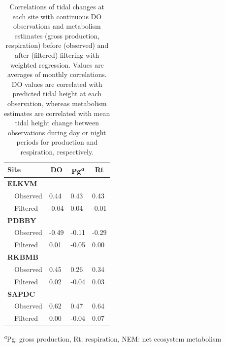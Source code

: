 \documentclass[letterpaper,12pt,oneside]{article}\usepackage[]{graphicx}\usepackage[]{color}
\begin{document}
\begin{table}[!tbp]
\caption{Correlations of tidal changes at each site with continuous \ac{DO} observations and metabolism estimates (gross production, respiration) before (observed) and after (filtered) filtering with weighted regression.  Values are averages of monthly correlations.  \ac{DO} values are correlated with predicted tidal height at each observation, whereas metabolism estimates are correlated with mean tidal height change between observations during day or night periods for production and respiration, respectively.\label{tab:cor_res}} 
\begin{center}
\begin{tabular}{llll}
\hline\hline
\multicolumn{1}{l}{Site}&\multicolumn{1}{c}{DO}&\multicolumn{1}{c}{Pg\textsuperscript{\textit{a}}}&\multicolumn{1}{c}{Rt}\tabularnewline
\hline
{\bfseries ELKVM}&&&\tabularnewline
~~Observed& 0.44& 0.43& 0.43\tabularnewline
~~Filtered&-0.04& 0.04&-0.01\tabularnewline
\hline
{\bfseries PDBBY}&&&\tabularnewline
~~Observed&-0.49&-0.11&-0.29\tabularnewline
~~Filtered& 0.01&-0.05& 0.00\tabularnewline
\hline
{\bfseries RKBMB}&&&\tabularnewline
~~Observed& 0.45& 0.26& 0.34\tabularnewline
~~Filtered& 0.02&-0.04& 0.03\tabularnewline
\hline
{\bfseries SAPDC}&&&\tabularnewline
~~Observed& 0.62& 0.47& 0.64\tabularnewline
~~Filtered& 0.00&-0.04& 0.07\tabularnewline
\hline
\end{tabular}\end{center}

\textsuperscript{\textit{a}}Pg: gross production, Rt: respiration, NEM: net ecosystem metabolism\end{table}
\end{document}

